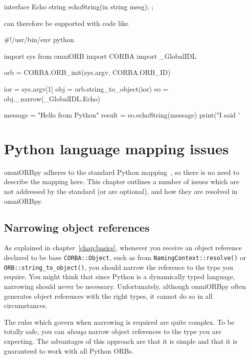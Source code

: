 \documentclass[11pt,oneside,a4paper]{book}
\newcommand{\type}[1]{\texttt{#1}}
\newcommand{\op}[1]{\texttt{#1()}}
\newcommand{\dsc}{\discretionary{}{}{}}
\begin{document}
\begin{idllisting}
interface Echo {
  string echoString(in string mesg);
};
\end{idllisting}

\noindent can therefore be supported with code like

\begin{pylisting}
#!/usr/bin/env python

import sys
from omniORB import CORBA
import _GlobalIDL

orb = CORBA.ORB_init(sys.argv, CORBA.ORB_ID)

ior = sys.argv[1]
obj = orb.string_to_object(ior)
eo  = obj._narrow(_GlobalIDL.Echo)

message = "Hello from Python"
result  = eo.echoString(message)
print("I said '%
\end{pylisting}



\chapter{Python language mapping issues}

omniORBpy adheres to the standard Python mapping~\cite{pythonmapping},
so there is no need to describe the mapping here. This chapter
outlines a number of issues which are not addressed by the standard
(or are optional), and how they are resolved in omniORBpy.

\section{Narrowing object references}
\label{sec:narrowing}

As explained in chapter~\ref{chap:basics}, whenever you receive an
object reference declared to be base \type{CORBA::Object}, such as
from \op{NamingContext::resolve} or
\op{ORB::\dsc{}string\_to\_object}, you should narrow the reference to
the type you require. You might think that since Python is a
dynamically typed language, narrowing should never be necessary.
Unfortunately, although omniORBpy often generates object references
with the right types, it cannot do so in all circumstances.

The rules which govern when narrowing is required are quite complex.
To be totally safe, you can \emph{always} narrow object references to
the type you are expecting. The advantages of this approach are that
it is simple and that it is guaranteed to work with all Python ORBs.
\end{document}
